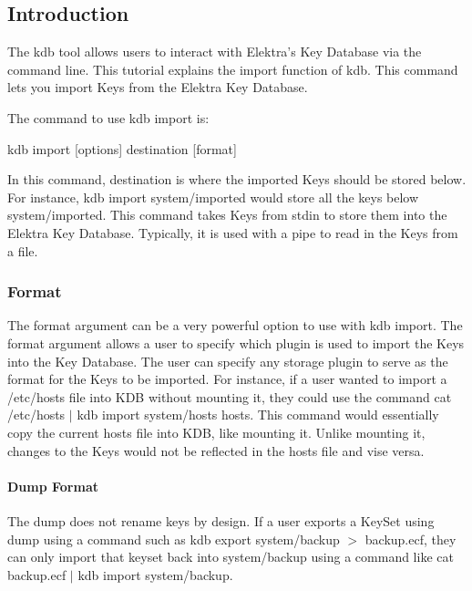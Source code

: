 \subsection*{Introduction}

The kdb tool allows users to interact with Elektra’s Key Database via the command line. This tutorial explains the import function of kdb. This command lets you import Keys from the Elektra Key Database.

The command to use kdb import is\+:


\begin{DoxyCode}
kdb import [options] destination [format]
\end{DoxyCode}


In this command, {\ttfamily destination} is where the imported Keys should be stored below. For instance, {\ttfamily kdb import system/imported} would store all the keys below {\ttfamily system/imported}. This command takes Keys from {\ttfamily stdin} to store them into the Elektra Key Database. Typically, it is used with a pipe to read in the Keys from a file.

\subsubsection*{Format}

The format argument can be a very powerful option to use with kdb import. The format argument allows a user to specify which plugin is used to import the Keys into the Key Database. The user can specify any storage plugin to serve as the format for the Keys to be imported. For instance, if a user wanted to import a {\ttfamily /etc/hosts} file into K\+DB without mounting it, they could use the command {\ttfamily cat /etc/hosts $\vert$ kdb import system/hosts hosts}. This command would essentially copy the current hosts file into K\+DB, like mounting it. Unlike mounting it, changes to the Keys would not be reflected in the hosts file and vise versa.

\paragraph*{Dump Format}

The dump does not rename keys by design. If a user exports a Key\+Set using dump using a command such as {\ttfamily kdb export system/backup $>$ backup.\+ecf}, they can only import that keyset back into {\ttfamily system/backup} using a command like {\ttfamily cat backup.\+ecf $\vert$ kdb import system/backup}.

